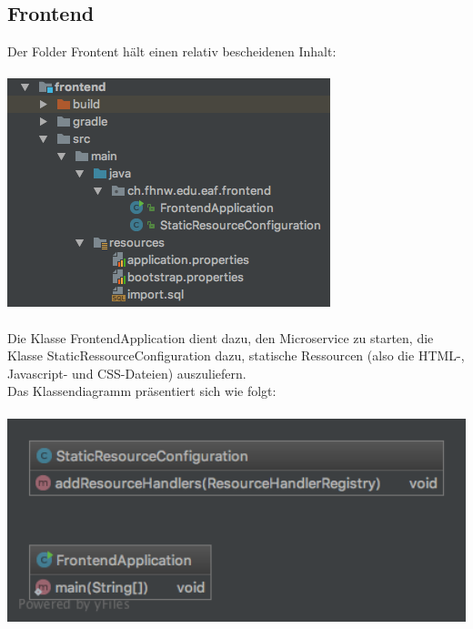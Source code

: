 \documentclass[11pt]{article} %
\begin{document}
\subsection{Frontend}
Der Folder Frontent hält einen relativ bescheidenen Inhalt:
\\
\\
\includegraphics[scale=0.7]{structure_frontend}
\\
\\
Die Klasse FrontendApplication dient dazu, den Microservice zu starten, die Klasse StaticRessourceConfiguration dazu, statische Ressourcen (also die HTML-, Javascript- und CSS-Dateien) auszuliefern.
\\
Das Klassendiagramm präsentiert sich wie folgt:
\\
\\
\includegraphics[width=1.0\textwidth]{class-diagrams/Frontend-00}
\\
\\
\end{document}
